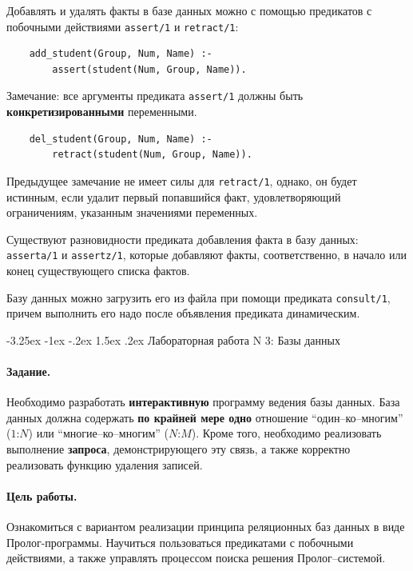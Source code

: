 \documentclass[12pt, openany, twoside]{book} %
\makeatletter
\renewcommand\section{\@startsection {section}{1}{\z@}%
                                   {-3.25ex \@plus -1ex \@minus -.2ex}%
                                   {1.5ex \@plus.2ex}%
                                   {\normalfont\large\bfseries}}
\makeatother
\begin{document}
Добавлять и удалять факты в базе данных можно с помощью предикатов с побочными действиями {\tt assert/1} и {\tt retract/1}:

{\tt\begin{verbatim}
    add_student(Group, Num, Name) :-
        assert(student(Num, Group, Name)).
\end{verbatim}}

\noindent Замечание: все аргументы предиката {\tt assert/1} должны быть {\bf конкретизированными} переменными.

{\tt\begin{verbatim}
    del_student(Group, Num, Name) :-
        retract(student(Num, Group, Name)).
\end{verbatim}}
\noindent Предыдущее замечание не имеет силы для {\tt retract/1}, однако, он будет истинным, если удалит первый попавшийся факт, удовлетворяющий ограничениям, указанным значениями переменных.

Существуют разновидности предиката добавления факта в базу данных: {\tt asserta/1} и {\tt assertz/1}, которые добавляют факты, соответственно, в начало или конец существующего списка фактов.

Базу данных можно загрузить его из файла при помощи предиката {\tt consult/1}, причем выполнить его надо после объявления предиката динамическим.

\section{Лабораторная работа N 3: Базы данных}
\paragraph{Задание.} Необходимо разработать {\bf интерактивную} программу ведения базы данных. База данных должна содержать {\bf по крайней мере одно} отношение ``один--ко--многим'' ($1$:$N$) или ``многие--ко--многим'' ($N$:$M$). Кроме того, необходимо реализовать выполнение {\bf запроса}, демонстрирующего эту связь, а также корректно реализовать функцию удаления записей.

\paragraph{Цель работы.} Ознакомиться с вариантом реализации принципа реляционных баз данных в виде Пролог-программы. Научиться пользоваться предикатами с побочными действиями, а также управлять процессом поиска решения Пролог--системой.
\end{document}
